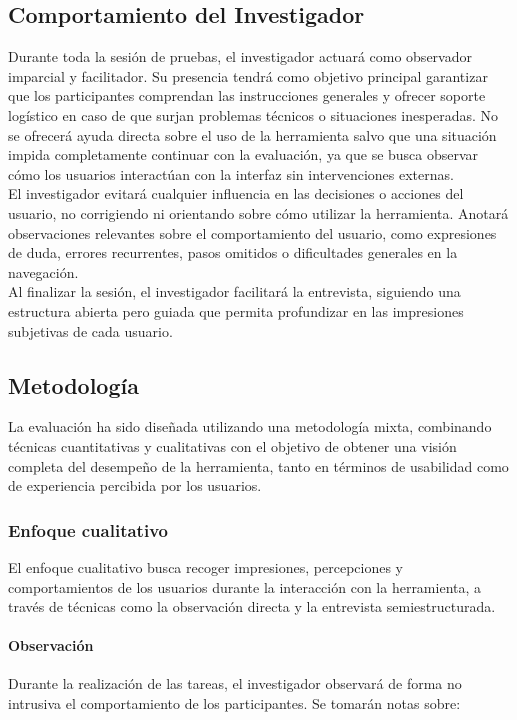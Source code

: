 \subsection{Comportamiento del Investigador}

Durante toda la sesión de pruebas, el investigador actuará como observador imparcial y facilitador. Su presencia tendrá como objetivo principal garantizar que los participantes comprendan las instrucciones generales y ofrecer soporte logístico en caso de que surjan problemas técnicos o situaciones inesperadas. No se ofrecerá ayuda directa sobre el uso de la herramienta salvo que una situación impida completamente continuar con la evaluación, ya que se busca observar cómo los usuarios interactúan con la interfaz sin intervenciones externas.\\

El investigador evitará cualquier influencia en las decisiones o acciones del usuario, no corrigiendo ni orientando sobre cómo utilizar la herramienta. Anotará observaciones relevantes sobre el comportamiento del usuario, como expresiones de duda, errores recurrentes, pasos omitidos o dificultades generales en la navegación.\\

Al finalizar la sesión, el investigador facilitará la entrevista, siguiendo una estructura abierta pero guiada que permita profundizar en las impresiones subjetivas de cada usuario.\\

\subsection{Metodología}

La evaluación ha sido diseñada utilizando una metodología mixta, combinando técnicas cuantitativas y cualitativas con el objetivo de obtener una visión completa del desempeño de la herramienta, tanto en términos de usabilidad como de experiencia percibida por los usuarios.

\subsubsection{Enfoque cualitativo}

El enfoque cualitativo busca recoger impresiones, percepciones y comportamientos de los usuarios durante la interacción con la herramienta, a través de técnicas como la observación directa y la entrevista semiestructurada.

\paragraph{Observación}
Durante la realización de las tareas, el investigador observará de forma no intrusiva el comportamiento de los participantes. Se tomarán notas sobre:

